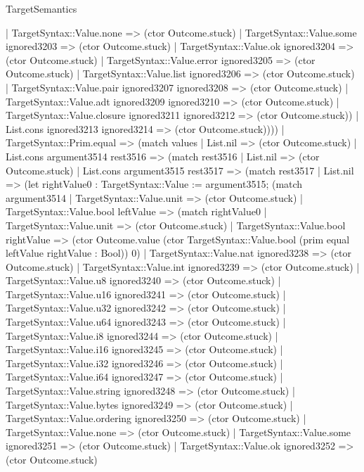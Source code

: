 \begin{lexlean}{TargetSemantics}
\begin{semanticmodule}
{            | TargetSyntax::Value.none => (ctor Outcome.stuck)
            | TargetSyntax::Value.some ignored3203 => (ctor Outcome.stuck)
            | TargetSyntax::Value.ok ignored3204 => (ctor Outcome.stuck)
            | TargetSyntax::Value.error ignored3205 => (ctor Outcome.stuck)
            | TargetSyntax::Value.list ignored3206 => (ctor Outcome.stuck)
            | TargetSyntax::Value.pair ignored3207 ignored3208 => (ctor Outcome.stuck)
            | TargetSyntax::Value.adt ignored3209 ignored3210 => (ctor Outcome.stuck)
            | TargetSyntax::Value.closure ignored3211 ignored3212 => (ctor Outcome.stuck))
          | List.cons ignored3213 ignored3214 => (ctor Outcome.stuck))))
    | TargetSyntax::Prim.equal => (match values
      | List.nil => (ctor Outcome.stuck)
      | List.cons argument3514 rest3516 => (match rest3516
        | List.nil => (ctor Outcome.stuck)
        | List.cons argument3515 rest3517 => (match rest3517
          | List.nil => (let rightValue0 : TargetSyntax::Value := argument3515; (match argument3514
            | TargetSyntax::Value.unit => (ctor Outcome.stuck)
            | TargetSyntax::Value.bool leftValue => (match rightValue0
              | TargetSyntax::Value.unit => (ctor Outcome.stuck)
              | TargetSyntax::Value.bool rightValue => (ctor Outcome.value (ctor TargetSyntax::Value.bool (prim equal leftValue rightValue : Bool)) 0)
              | TargetSyntax::Value.nat ignored3238 => (ctor Outcome.stuck)
              | TargetSyntax::Value.int ignored3239 => (ctor Outcome.stuck)
              | TargetSyntax::Value.u8 ignored3240 => (ctor Outcome.stuck)
              | TargetSyntax::Value.u16 ignored3241 => (ctor Outcome.stuck)
              | TargetSyntax::Value.u32 ignored3242 => (ctor Outcome.stuck)
              | TargetSyntax::Value.u64 ignored3243 => (ctor Outcome.stuck)
              | TargetSyntax::Value.i8 ignored3244 => (ctor Outcome.stuck)
              | TargetSyntax::Value.i16 ignored3245 => (ctor Outcome.stuck)
              | TargetSyntax::Value.i32 ignored3246 => (ctor Outcome.stuck)
              | TargetSyntax::Value.i64 ignored3247 => (ctor Outcome.stuck)
              | TargetSyntax::Value.string ignored3248 => (ctor Outcome.stuck)
              | TargetSyntax::Value.bytes ignored3249 => (ctor Outcome.stuck)
              | TargetSyntax::Value.ordering ignored3250 => (ctor Outcome.stuck)
              | TargetSyntax::Value.none => (ctor Outcome.stuck)
              | TargetSyntax::Value.some ignored3251 => (ctor Outcome.stuck)
              | TargetSyntax::Value.ok ignored3252 => (ctor Outcome.stuck)
}
\end{semanticmodule}
\end{lexlean}
